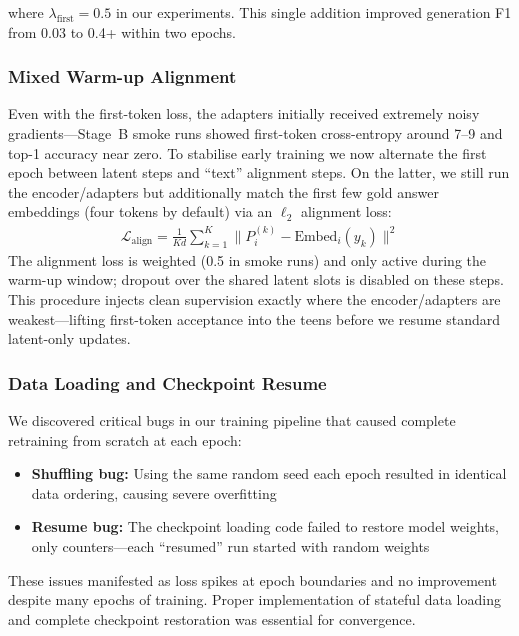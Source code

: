 \documentclass{article}
\begin{document}
where $\lambda_{\text{first}} = 0.5$ in our experiments. This single addition improved generation F1 from 0.03 to 0.4+ within two epochs.

\subsubsection{Mixed Warm-up Alignment}

Even with the first-token loss, the adapters initially received extremely noisy gradients—Stage~B smoke runs showed first-token cross-entropy around 7--9 and top-1 accuracy near zero. To stabilise early training we now alternate the first epoch between latent steps and ``text'' alignment steps. On the latter, we still run the encoder/adapters but additionally match the first few gold answer embeddings (four tokens by default) via an $\ell_2$ alignment loss:
\begin{align}
\mathcal{L}_{\text{align}} = \frac{1}{K d} \sum_{k=1}^{K} \lVert P_i^{(k)} - \text{Embed}_i(y_k) \rVert^2
\end{align}
The alignment loss is weighted (0.5 in smoke runs) and only active during the warm-up window; dropout over the shared latent slots is disabled on these steps. This procedure injects clean supervision exactly where the encoder/adapters are weakest—lifting first-token acceptance into the teens before we resume standard latent-only updates.

\subsubsection{Data Loading and Checkpoint Resume}

We discovered critical bugs in our training pipeline that caused complete retraining from scratch at each epoch:
\begin{itemize}
\item \textbf{Shuffling bug:} Using the same random seed each epoch resulted in identical data ordering, causing severe overfitting
\item \textbf{Resume bug:} The checkpoint loading code failed to restore model weights, only counters—each ``resumed'' run started with random weights
\end{itemize}

These issues manifested as loss spikes at epoch boundaries and no improvement despite many epochs of training. Proper implementation of stateful data loading and complete checkpoint restoration was essential for convergence.
\end{document}
